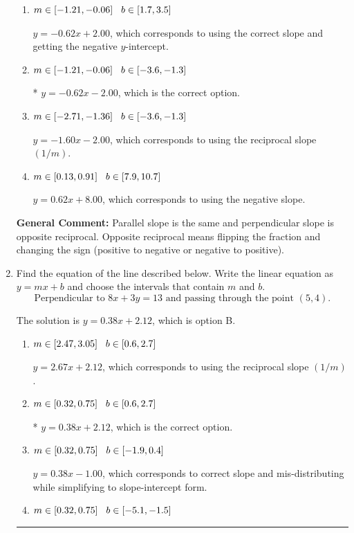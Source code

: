 \documentclass{extbook}[14pt]
\newcommand{\litem}[1]{\item #1

\rule{\textwidth}{0.4pt}}
\begin{document}
\begin{enumerate}
{\begin{enumerate}[label=\Alph*.]
 $y = -0.62x + 11.00$, which corresponds to correct slope and mis-distributing while simplifying to slope-intercept form.
\item \( m \in [-1.21, -0.06] \hspace*{3mm} b \in [1.7, 3.5] \)

 $y = -0.62x + 2.00$, which corresponds to using the correct slope and getting the negative $y$-intercept.
\item \( m \in [-1.21, -0.06] \hspace*{3mm} b \in [-3.6, -1.3] \)

* $y = -0.62x - 2.00$, which is the correct option.
\item \( m \in [-2.71, -1.36] \hspace*{3mm} b \in [-3.6, -1.3] \)

 $y = -1.60x - 2.00$, which corresponds to using the reciprocal slope $(1/m)$.
\item \( m \in [0.13, 0.91] \hspace*{3mm} b \in [7.9, 10.7] \)

 $y = 0.62x + 8.00$, which corresponds to using the negative slope.
\end{enumerate}

\textbf{General Comment:} Parallel slope is the same and perpendicular slope is opposite reciprocal. Opposite reciprocal means flipping the fraction and changing the sign (positive to negative or negative to positive).
}
\litem{
Find the equation of the line described below. Write the linear equation as $ y=mx+b $ and choose the intervals that contain $m$ and $b$.
\[ \text{Perpendicular to } 8 x + 3 y = 13 \text{ and passing through the point } (5, 4). \]

The solution is \( y = 0.38x + 2.12 \), which is option B.\begin{enumerate}[label=\Alph*.]
\item \( m \in [2.47, 3.05] \hspace*{3mm} b \in [0.6, 2.7] \)

 $y = 2.67x + 2.12$, which corresponds to using the reciprocal slope $(1/m)$.
\item \( m \in [0.32, 0.75] \hspace*{3mm} b \in [0.6, 2.7] \)

* $y = 0.38x + 2.12$, which is the correct option.
\item \( m \in [0.32, 0.75] \hspace*{3mm} b \in [-1.9, 0.4] \)

 $y = 0.38x - 1.00$, which corresponds to correct slope and mis-distributing while simplifying to slope-intercept form.
\item \( m \in [0.32, 0.75] \hspace*{3mm} b \in [-5.1, -1.5] \)


\end{enumerate}}
\end{enumerate}
\end{document}
